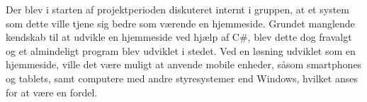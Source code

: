 Der blev i starten af projektperioden diskuteret internt i gruppen, at et system som dette ville tjene sig bedre som værende en hjemmeside.
Grundet manglende kendskab til at udvikle en hjemmeside ved hjælp af C\#, blev dette dog fravalgt og et almindeligt program blev udviklet i stedet. 
Ved en løsning udviklet som en hjemmeside, ville det være muligt at anvende mobile enheder, såsom smartphones og tablets, samt computere med andre styresystemer end Windows, hvilket anses for at være en fordel.  
